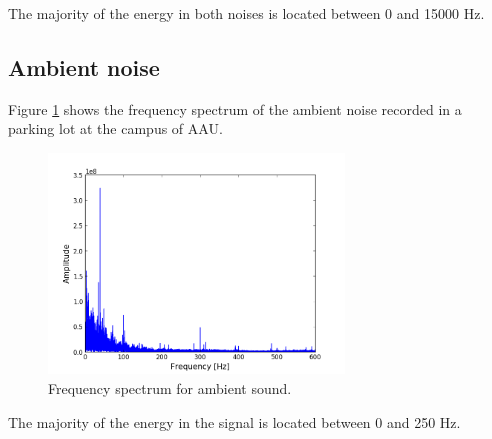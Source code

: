 The majority of the energy in both noises is located between 0 and 15000 Hz.
\subsection{Ambient noise}
Figure \ref{fig:ambient} shows the frequency spectrum of the ambient noise recorded in a parking lot at the campus of AAU.
\begin{figure}[H]
\centering
\includegraphics[width=0.7\textwidth]{figures/freqanal/ambient.png}
\caption{Frequency spectrum for ambient sound.}
\label{fig:ambient}
\end{figure}
The majority of the energy in the signal is located between 0 and 250 Hz.











